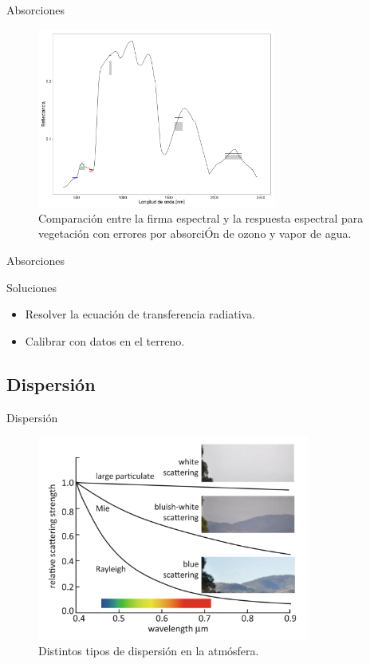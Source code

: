 \documentclass[]{beamer}
\begin{document}
\begin{frame}{Absorciones}
  \begin{figure}
  \centering
  \includegraphics[width=0.7\textwidth]{imagenes/abs_veg_esp.png}
  \caption{Comparación entre la firma espectral y la respuesta espectral para vegetación con errores por absorciÓn de ozono y vapor de agua.}
  \end{figure}
\end{frame}


\begin{frame}{Absorciones}
  \begin{block}{Soluciones}
   \begin{itemize}
     \item<1-> Resolver la ecuación de transferencia radiativa.
     \item<2>  Calibrar con datos en el terreno.
   \end{itemize}
  \end{block}
\end{frame}

\subsection{Dispersión}

\begin{frame}{Dispersión}
  \begin{figure}
  \centering
  \includegraphics[width=0.8\textwidth]{imagenes/dispersion.png}
  \caption{Distintos tipos de dispersión en la atmósfera.}
  \end{figure}
\end{frame}
\end{document}
